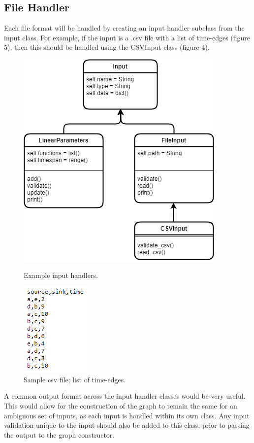\begin{design}
\subsection{File Handler}
Each file format will be handled by creating an input handler subclass from the input class. For example, if the input is a .csv file with a list of time-edges (figure 5), then this should be handled using the CSVInput class (figure 4).
\begin{figure}[h]
  \centering
  \begin{minipage}[b]{0.4\textwidth}
    \centering
    \includegraphics[scale=0.6]{images/UML_input.png}
    \caption{Example input handlers.}
  \end{minipage}
  \hfill
  \begin{minipage}[b]{0.4\textwidth}
    \centering
    \includegraphics[scale=0.8]{images/csv.PNG}
    \caption{Sample csv file; list of time-edges.}
  \end{minipage}
\end{figure}
A common output format across the input handler classes would be very useful. This would allow for the construction of the graph to remain the same for an ambiguous set of inputs, as each input is handled within its own class. Any input validation unique to the input should also be added to this class, prior to passing the output to the graph constructor.

\end{design}
